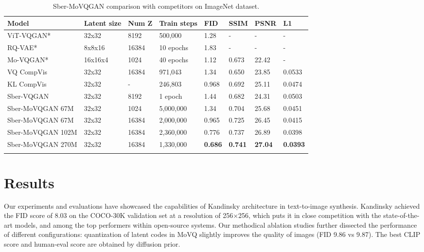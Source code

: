 \documentclass[11pt]{article}
\begin{document}
\begin{table*}[hbt!]
\small
\centering
\caption{Sber-MoVQGAN comparison with competitors on ImageNet dataset.}
\label{tab:model_comparisons}
\begin{tabular}{llllllll}
\hline
\bf Model & \bf  Latent size & \bf  Num Z & \bf  Train steps & \bf  FID  & \bf  SSIM  & \bf  PSNR  & \bf  L1  \\
\hline
ViT-VQGAN* & 32x32 & 8192 & 500,000 & 1.28 & - & - & - \\
RQ-VAE* & 8x8x16 & 16384 &  10 epochs & 1.83 & - & - & - \\
Mo-VQGAN* & 16x16x4 & 1024 &  40 epochs & 1.12 & 0.673 & 22.42 & - \\
VQ CompVis & 32x32 & 16384 & 971,043 & 1.34 & 0.650 & 23.85 & 0.0533 \\
KL CompVis & 32x32 & - & 246,803 & 0.968 & 0.692 & 25.11 & 0.0474 \\
Sber-VQGAN & 32x32 & 8192 & 1 epoch & 1.44 & 0.682 & 24.31 & 0.0503 \\
Sber-MoVQGAN 67M & 32x32 & 1024 & 5,000,000 & 1.34 & 0.704 & 25.68 & 0.0451 \\
Sber-MoVQGAN 67M & 32x32 & 16384 & 2,000,000 & 0.965 & 0.725 & 26.45 & 0.0415 \\
Sber-MoVQGAN 102M & 32x32 & 16384 & 2,360,000 & 0.776 & 0.737 & 26.89 & 0.0398 \\
Sber-MoVQGAN 270M & 32x32 & 16384 & 1,330,000 & \textbf{0.686} & \textbf{0.741} & \textbf{27.04} & \textbf{0.0393}\\\hline
\label{movq}
\end{tabular}
\end{table*}


\section{Results}

Our experiments and evaluations have showcased the capabilities of Kandinsky architecture in text-to-image synthesis. Kandinsky achieved the FID score of 8.03 on the COCO-30K validation set at a resolution of 256×256, which puts it in close competition with the state-of-the-art models, and among the top performers within open-source systems. Our methodical ablation studies further dissected the performance of different configurations: quantization of latent codes in MoVQ slightly improves the quality of images (FID 9.86 vs 9.87). The best CLIP score and human-eval score are obtained by diffusion prior. 
\end{document}
